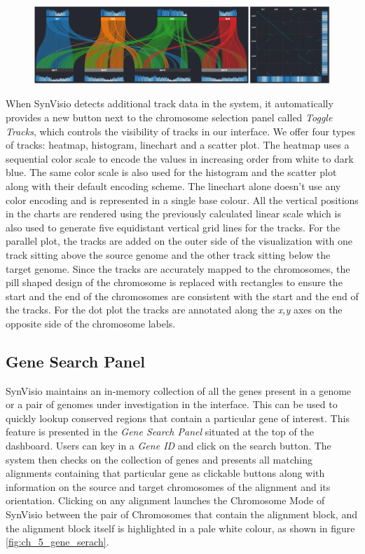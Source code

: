 \begin{figure}
  \centering
  \includegraphics[width=1\linewidth]{images/ch_5_tracks.PNG}
  \label{fig:ch_5_tracks}
\end{figure}
When SynVisio detects additional track data in the system, it automatically provides a new button next to the chromosome selection panel called \textit{Toggle Tracks}, which controls
the visibility of tracks in our interface. We offer four types of tracks: heatmap, histogram, linechart and a scatter plot. The heatmap uses a sequential color scale to encode the values in increasing order from white to dark blue. The same color scale is also used for the histogram and the scatter plot along with their default encoding scheme. The linechart alone doesn't use any color encoding and is represented in a single base colour. All the vertical positions in the charts are rendered using the previously calculated linear scale which is also used to generate five equidistant vertical grid lines for the tracks. For the parallel plot, the tracks are added on the outer side of the visualization with one track sitting above the source genome and the other track sitting below the target genome. Since the tracks are accurately mapped to the chromosomes, the pill shaped design of the chromosome is replaced with rectangles to ensure the start and the end of the chromosomes are consistent with the start and the end of the tracks. For the dot plot the tracks are annotated along the \textit{x,y} axes on the opposite side of the chromosome labels.


\subsection{Gene Search Panel}
SynVisio maintains an in-memory collection of all the genes present in a genome or a pair of genomes under investigation in the interface. This can be used to quickly lookup conserved regions that contain a particular gene of interest. This feature is presented in the \textit{Gene Search Panel} situated at the top of the dashboard. Users can key in a \textit{Gene ID} and click on the search button. The system then checks on the collection of genes and presents all matching alignments containing that particular gene as clickable buttons along with information on the source and target chromosomes of the alignment and its orientation. Clicking on any alignment launches the Chromosome Mode of SynVisio between the pair of Chromosomes that contain the alignment block, and the alignment block itself is highlighted in a pale white colour, as shown in figure \ref{fig:ch_5_gene_serach}. 

